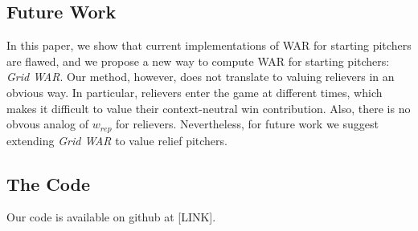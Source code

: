 \documentclass[12pt]{article}
\begin{document}
\subsection{Future Work}

In this paper, we show that current implementations of WAR for starting pitchers are flawed, and we propose a new way to compute WAR for starting pitchers: \textit{Grid WAR}. Our method, however, does not translate to valuing relievers in an obvious way. In particular, relievers enter the game at different times, which makes it difficult to value their context-neutral win contribution. Also, there is no obvous analog of $w_{rep}$ for relievers. Nevertheless, for future work we suggest extending \textit{Grid WAR} to value relief pitchers.

\subsection{The Code}

Our code is available on github at [LINK].


 \clearpage
 
 
\end{document}
